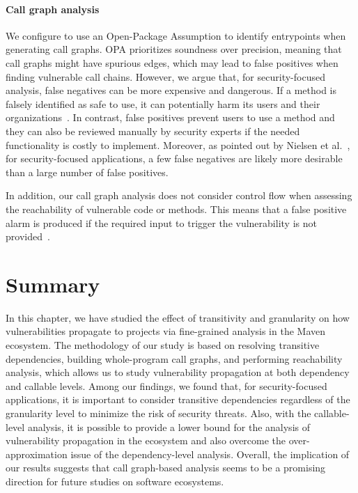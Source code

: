 \paragraph{Call graph analysis}
We configure  to use an Open-Package Assumption to identify entrypoints when generating call graphs.
OPA prioritizes soundness over precision, meaning that call graphs might have spurious edges, which may lead to false positives when finding vulnerable call chains. However, we argue that, for security-focused analysis, false negatives can be more expensive and dangerous. If a method is falsely identified as safe to use, it can potentially harm its users and their organizations~\cite{hagberg2021using}. In contrast, false positives prevent users to use a method and they can also be reviewed manually by security experts if the needed functionality is costly to implement. Moreover, as pointed out by Nielsen et al.~\cite{nielsen2021modular}, for security-focused applications, a few false negatives are likely more desirable than a large number of false positives. 

In addition, our call graph analysis does not consider control flow when assessing the reachability of vulnerable code or methods. This means that a false positive alarm is produced if the required input to trigger the vulnerability is not provided~\cite{kang2022test}. 

\section{Summary}\label{ch3:sec:conclusion}
In this chapter, we have studied the effect of transitivity and granularity on how vulnerabilities propagate to projects via fine-grained analysis in the Maven ecosystem. The methodology of our study is based on resolving transitive dependencies, building whole-program call graphs, and performing reachability analysis, which allows us to study vulnerability propagation at both dependency and callable levels. Among our findings, we found that, for security-focused applications, it is important to consider transitive dependencies regardless of the granularity level to minimize the risk of security threats. Also, with the callable-level analysis, it is possible to provide a lower bound for the analysis of vulnerability propagation in the ecosystem and also overcome the over-approximation issue of the dependency-level analysis. Overall, the implication of our results suggests that call graph-based analysis seems to be a promising direction for future studies on software ecosystems.